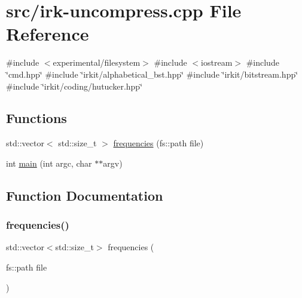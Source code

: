 \hypertarget{irk-uncompress_8cpp}{}\section{src/irk-\/uncompress.cpp File Reference}
\label{irk-uncompress_8cpp}
{\ttfamily \#include $<$experimental/filesystem$>$}\newline
{\ttfamily \#include $<$iostream$>$}\newline
{\ttfamily \#include \char`\"{}cmd.\+hpp\char`\"{}}\newline
{\ttfamily \#include \char`\"{}irkit/alphabetical\+\_\+bst.\+hpp\char`\"{}}\newline
{\ttfamily \#include \char`\"{}irkit/bitstream.\+hpp\char`\"{}}\newline
{\ttfamily \#include \char`\"{}irkit/coding/hutucker.\+hpp\char`\"{}}\newline
\subsection*{Functions}
\begin{DoxyCompactItemize}
\item 
std\+::vector$<$ std\+::size\+\_\+t $>$ \mbox{\hyperlink{irk-uncompress_8cpp_a2cd80733ced3d7eda8a6de0389cccc73}{frequencies}} (fs\+::path file)
\item 
int \mbox{\hyperlink{irk-uncompress_8cpp_a3c04138a5bfe5d72780bb7e82a18e627}{main}} (int argc, char $\ast$$\ast$argv)
\end{DoxyCompactItemize}


\subsection{Function Documentation}
\mbox{\label{irk-uncompress_8cpp_a2cd80733ced3d7eda8a6de0389cccc73}} 
\subsubsection{\texorpdfstring{frequencies()}{frequencies()}}
{\footnotesize\ttfamily std\+::vector$<$std\+::size\+\_\+t$>$ frequencies (\begin{DoxyParamCaption}\item[{fs\+::path}]{file }\end{DoxyParamCaption})}

